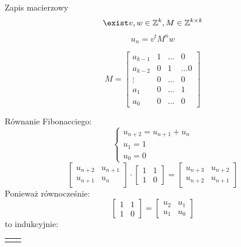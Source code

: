\documentclass[handout]{beamer}
\theoremstyle{definition}
\begin{document}
\begin{frame}{Zapis macierzowy}
    $$\exist v, w \in \mathbb{Z}^{k}, M \in \mathbb{Z}^{k\times k} $$
    $$u_n = v^{t}M^{n}w$$

    $$
    M = \begin{bmatrix}
    a_{k-1} & 1 &  \ldots & 0 \\
    a_{k-2} & 0 & 1 & \ldots 0  \\
    \vdots & 0 & \ldots & 0 \\ 
    a_1 & 0 & \ldots & 1 \\
    a_0 & 0 & \ldots & 0
    \end{bmatrix}
    $$
\end{frame}

\begin{frame}{Równanie Fibonacciego:}
\begin{equation*}
\begin{cases}
u_{n+2} = u_{n+1} + u_n \\
u_{1} = 1 \\
u_{0} = 0 
\end{cases}
\end{equation*}
\begin{equation*}
        \begin{bmatrix}
        u_{n+2} & u_{n+1} \\
        u_{n+1} & u_{n} 
        \end{bmatrix} 
        \cdot
        \begin{bmatrix}
        1 & 1\\
        1 & 0
        \end{bmatrix}
        = 
        \begin{bmatrix}
        u_{n+3} & u_{n+2}\\
        u_{n+2} & u_{n+1}
        \end{bmatrix}
\end{equation*}
Ponieważ równocześnie:
\begin{equation*}
    \begin{bmatrix}
    1 & 1 \\
    1 & 0 
    \end{bmatrix}= 
    \begin{bmatrix}
    u_2 & u_1 \\
    u_1 & u_0
    
    \end{bmatrix}
\end{equation*}
to indukcyjnie: 
\begin{table}[]
    \centering
    \begin{tabular}{c|c}
       \begin{equation*}
    

\end{equation*}
\end{tabular}
\end{table}
\end{frame}
\end{document}
